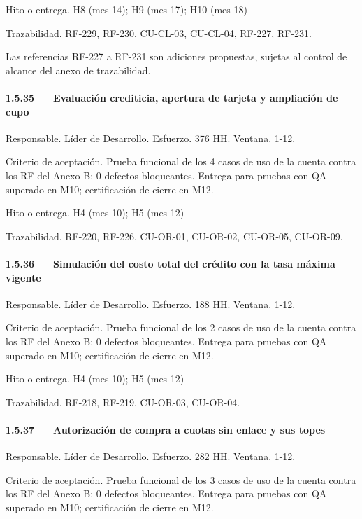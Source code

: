 \documentclass[11pt]{article}
\begin{document}
Hito o entrega. H8 (mes 14); H9 (mes 17); H10 (mes 18)

Trazabilidad. RF-229, RF-230, CU-CL-03, CU-CL-04, RF-227, RF-231.

Las referencias RF-227 a RF-231 son adiciones propuestas, sujetas al control de alcance del anexo de trazabilidad.

\paragraph{1.5.35 — Evaluación crediticia, apertura de tarjeta y ampliación de cupo}

Responsable. Líder de Desarrollo. Esfuerzo. 376 HH. Ventana. 1-12.

Criterio de aceptación. Prueba funcional de los 4 casos de uso de la cuenta contra los RF del Anexo B; 0 defectos bloqueantes. Entrega para pruebas con QA superado en M10; certificación de cierre en M12.

Hito o entrega. H4 (mes 10); H5 (mes 12)

Trazabilidad. RF-220, RF-226, CU-OR-01, CU-OR-02, CU-OR-05, CU-OR-09.

\paragraph{1.5.36 — Simulación del costo total del crédito con la tasa máxima vigente}

Responsable. Líder de Desarrollo. Esfuerzo. 188 HH. Ventana. 1-12.

Criterio de aceptación. Prueba funcional de los 2 casos de uso de la cuenta contra los RF del Anexo B; 0 defectos bloqueantes. Entrega para pruebas con QA superado en M10; certificación de cierre en M12.

Hito o entrega. H4 (mes 10); H5 (mes 12)

Trazabilidad. RF-218, RF-219, CU-OR-03, CU-OR-04.

\paragraph{1.5.37 — Autorización de compra a cuotas sin enlace y sus topes}

Responsable. Líder de Desarrollo. Esfuerzo. 282 HH. Ventana. 1-12.

Criterio de aceptación. Prueba funcional de los 3 casos de uso de la cuenta contra los RF del Anexo B; 0 defectos bloqueantes. Entrega para pruebas con QA superado en M10; certificación de cierre en M12.
\end{document}
